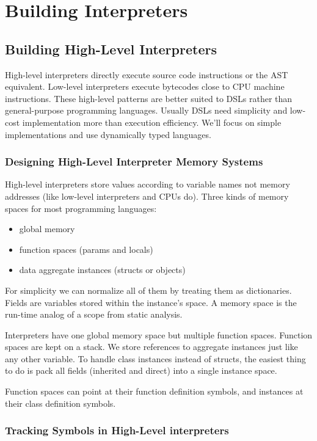 \section{Building Interpreters}


\subsection{Building High-Level Interpreters}

High-level interpreters directly execute source code instructions
or the AST equivalent.
Low-level interpreters execute bytecodes close to CPU machine instructions.
These high-level patterns are better suited to DSLs
rather than general-purpose programming languages.
Usually DSLs need simplicity and low-cost implementation
more than execution efficiency.
We'll focus on simple implementations and use dynamically typed languages.

\subsubsection{Designing High-Level Interpreter Memory Systems}
High-level interpreters store values according to variable names
not memory addresses (like low-level interpreters and CPUs do).
Three kinds of memory spaces for most programming languages:
\begin{itemize}
\item global memory
\item function spaces (params and locals)
\item data aggregate instances (structs or objects)
\end{itemize}

For simplicity we can normalize all of them by treating them as dictionaries.
Fields are variables stored within the instance's space.
A memory space is the run-time analog of a scope from static analysis.

Interpreters have one global memory space but multiple function spaces.
Function spaces are kept on a stack.
We store references to aggregate instances just like any other variable.
To handle class instances instead of structs,
the easiest thing to do is pack all fields (inherited and direct)
into a single instance space.

Function spaces can point at their function definition symbols,
and instances at their class definition symbols.

\subsubsection{Tracking Symbols in High-Level interpreters}

